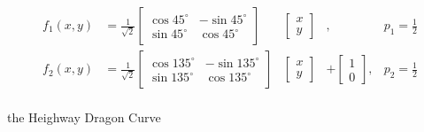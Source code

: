 \documentclass[11pt]{article}
\begin{document}
\begin{ifs}
$$ 
\begin{aligned}
f_1(x,y) &= \frac{1}{\sqrt{2}}\begin{bmatrix} \cos 45^\circ & -\sin 45^\circ \\ \sin 45^\circ & \cos 45^\circ \end{bmatrix} & \begin{bmatrix} x \\ y \end{bmatrix} & , &p_1 = \frac{1}{2} \\
f_2(x,y) &= \frac{1}{\sqrt{2}}\begin{bmatrix} \cos 135^\circ & -\sin 135^\circ \\ \sin 135^\circ & \cos 135^\circ \end{bmatrix} & \begin{bmatrix} x \\ y \end{bmatrix} &+ \begin{bmatrix} 1 \\ 0 \end{bmatrix} , &p_2 = \frac{1}{2} \\
\end{aligned}
$$

\caption{the Heighway Dragon Curve}
\label{ifs:dragon_curve}
\end{ifs}
\end{document}
